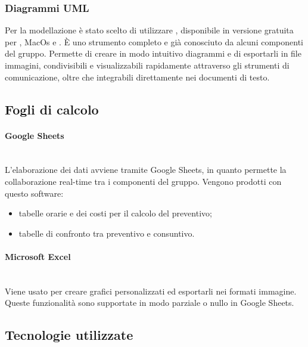 \subsubsection{Diagrammi UML}
Per la modellazione  è stato scelto di utilizzare \textbf{}, disponibile in versione gratuita per , MacOs e . \`{E} uno strumento completo e già conosciuto da alcuni componenti del gruppo. Permette di creare in modo intuitivo diagrammi  e di esportarli in file immagini, condivisibili e visualizzabili rapidamente attraverso gli strumenti di comunicazione, oltre che integrabili direttamente nei documenti di testo.

\subsection{Fogli di calcolo} \label{sec:fogli_di_calcolo}
\paragraph{Google Sheets}\mbox{}\\
L'elaborazione dei dati avviene tramite Google Sheets, in quanto permette la collaborazione real-time tra i componenti del gruppo. Vengono prodotti con questo software:
	\begin{itemize}
	\item tabelle orarie e dei costi per il calcolo del preventivo;
	\item tabelle di confronto tra preventivo e consuntivo.
	\end{itemize}

\paragraph{Microsoft Excel} \mbox{}\\
Viene usato per creare grafici personalizzati ed esportarli nei formati immagine. Queste funzionalità sono supportate in modo parziale o nullo in Google Sheets. 

\subsection{Tecnologie utilizzate}
